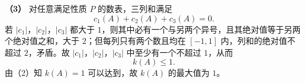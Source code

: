 \begin{answer}
\textbf{（3）} 对任意满足性质 $P$ 的数表，三列和满足
\nopagebreak[4]
\[c_1(A)+c_2(A)+c_3(A)=0.\]
若 $|c_1|$，$|c_2|$，$|c_3|$ 都大于 $1$，则其中必有一个与另两个异号，且其绝对值等于另两个绝对值之和，大于 $2$；但每列只有两个数且均在 $[-1,1]$ 内，列和的绝对值不超过 $2$，矛盾。故 $|c_1|$，$|c_2|$，$|c_3|$ 中至少有一个不超过 $1$，从而
\nopagebreak[4]
\[k(A)\leqslant1.\]
由（2）知 $k(A)=1$ 可以达到，故 $k(A)$ 的最大值为 $1$。




\end{answer}